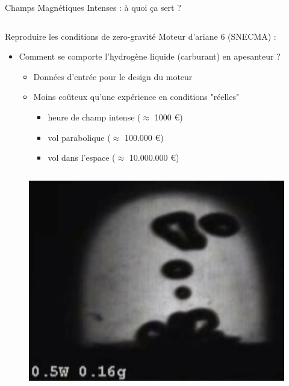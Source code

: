 

\begin{frame}{Champs Magnétiques Intenses : à quoi ça sert ?}
    \begin{columns}[c]
      \begin{column}{0.78\textwidth}
        \begin{block}{Reproduire les conditions de zero-gravité}
          Moteur d'ariane 6 (SNECMA) : 
          \begin{itemize}
          \item Comment se comporte l'hydrogène liquide (carburant) en apesanteur ?
            \begin{itemize}
            \item Données d'entrée pour le design du moteur
            \item Moins coûteux qu'une expérience en conditions "réelles"
              \begin{itemize}
              \item heure de champ intense ($\approx$ 1000 \euro)
              \item vol parabolique ($\approx$ 100.000 \euro)
              \item vol dans l'espace ($\approx$ 10.000.000 \euro)
              \end{itemize}
            \end{itemize}
          \end{itemize}
          \vspace*{-0.4cm}
          \begin{columns}[c]
            \begin{column}{0.5\textwidth}
              \begin{figure}[H]
                \centering
                \includegraphics[scale=0.1]{Figures/cmi/levitation_1.png}

\end{figure}
\end{column}
\end{columns}
\end{block}
\end{column}
\end{columns}
\end{frame}
